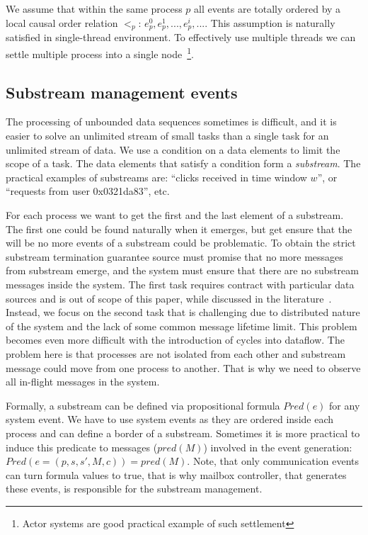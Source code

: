 We assume that within the same process $p$ all events are totally ordered by a local causal order relation $<_p$: $e^{0}_p,e^{1}_p,...,e^{i}_p,...$. This assumption is naturally satisfied in single-thread environment. To effectively use multiple threads we can settle multiple process into a single node~\footnote{Actor systems are good practical example of such settlement}.


\subsection{Substream management events}
The processing of unbounded data sequences sometimes is difficult, and it is easier to solve an unlimited stream of small tasks than a single task for an unlimited stream of data. We use a condition on a data elements to limit the scope of a task. The data elements that satisfy a condition form a {\em substream}. The practical examples of substreams are: ``clicks received in time window $w$'', or ``requests from user 0x0321da83'', etc.

For each process we want to get the first and the last element of a substream. The first one could be found naturally when it emerges, but get ensure that the will be no more events of a substream could be problematic. To obtain the strict substream termination guarantee source must promise that no more messages from substream emerge, and the system must ensure that there are no substream messages inside the system. The first task requires contract with particular data sources and is out of scope of this paper, while discussed in the literature~\cite{awad2019adaptive}. Instead, we focus on the second task that is challenging due to distributed nature of the system and the lack of some common message lifetime limit. This problem becomes even more difficult with the introduction of cycles into dataflow. The problem here is that processes are not isolated from each other and substream message could move from one process to another. That is why we need to observe all in-flight messages in the system.

Formally, a substream can be defined via propositional formula $Pred(e)$ for any system event. We have to use system events as they are ordered inside each process and can define a border of a substream. Sometimes it is more practical to induce this predicate to messages ($pred(M)$) involved in the event generation: $Pred(e=(p, s, s', M, c)) = pred(M)$. Note, that only communication events can turn formula values to true, that is why mailbox controller, that generates these events, is responsible for the substream management. 

